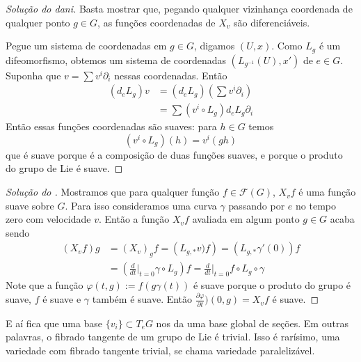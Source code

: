 \begin{proof}[Solução do dani]\leavevmode
Basta mostrar que, pegando qualquer vizinhança coordenada de qualquer ponto \(g \in G\), as funções coordenadas de \(X_v\) são diferenciáveis.

Pegue um sistema de coordenadas em  \(g \in G\), digamos \((U,x)\). Como  \(L_g\) é um difeomorfismo, obtemos um sistema de coordenadas \((L_{g^{-1}}(U),x')\) de \(e \in G\). Suponha que \(v=\sum v^i\partial_i\) nessas coordenadas. Então
\begin{align*}
	(d_eL_g)v&=(d_eL_g)\left(\sum v^i\partial_i\right) \\
	&=\sum (v^i \circ L_g)d_eL_g\partial_i
\end{align*}
Então essas funções coordenadas são suaves: para \(h \in G\) temos
\[(v^i \circ L_g)(h)=v^i(gh)\]
que é suave porque é a composição de duas funções suaves, e porque o produto do grupo de Lie é suave.
\end{proof}

\begin{proof}[Solução do \cite{les}]\leavevmode
Mostramos que para qualquer função \(f \in \mathcal{F}(G)\), \(X_vf\) é uma função suave sobre \(G\). Para isso consideramos uma curva \(\gamma\) passando por \(e\) no tempo zero com velocidade \(v\). Então a função \(X_vf\) avaliada em algum ponto  \(g \in G\) acaba sendo
\begin{align*}
	(X_vf)g&=(X_v)_gf=\left(L_{g,*}v)f\right) =\left(L_{g,*}\gamma'(0)\right)f\\
	&=\left(\frac{d}{dt}\Big|_{t=0}\gamma \circ L_g\right) f=\frac{d}{dt}\Big|_{t=0}f \circ L_g \circ \gamma
\end{align*}
Note que a função \(\varphi(t,g):=f(g \gamma(t))\) é suave porque o produto do grupo é suave, \(f \) é suave e \(\gamma\) também é suave. Então \(\frac{\partial \varphi}{\partial t})(0,g)=X_vf\) é suave.
\end{proof}

E aí fica que uma base \(\{v_i\}\subset T_eG\) nos da uma base global de seções. Em outras palavras, o fibrado tangente de um grupo de Lie é trivial. Isso é rarísimo, uma variedade com fibrado tangente trivial, se chama variedade paralelizável.

